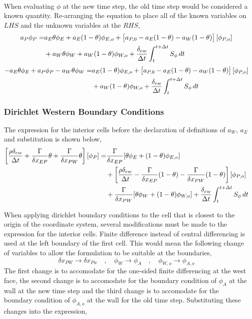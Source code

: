 \documentclass[a4paper, 12pt]{report}
\begin{document}
\begin{center}
\begin{equation*}
\begin{split}
\end{split}
\end{equation*}
When evaluating $\phi$ at the new time step, the old time step would be considered a known quantity. Re-arranging the equation to place all of the known variables on $LHS$ and the unknown variables at the $RHS$,
\begin{equation*}
\begin{split}
a_P\phi_{P} = & a_E\theta\phi_{E} + a_E(1-\theta)\phi_{E,o} + \left[a_{P,0} - a_E(1-\theta) - a_W(1-\theta)\right][\phi_{P,o}] \\ & + a_W\theta\phi_{W} + a_W(1-\theta)\phi_{W,o} + \frac{\delta_{ew}}{\Delta t}\int^{t+\Delta t}_{t} S_\phi\,dt 
\end{split}
\end{equation*}
\begin{equation*}
\begin{split}
 - a_E\theta\phi_{E} + a_P\phi_{P}  - a_W\theta\phi_{W} = & a_E(1-\theta)\phi_{E,o} + \left[a_{P,0} - a_E(1-\theta) - a_W(1-\theta)\right][\phi_{P,o}] \\ & + a_W(1-\theta)\phi_{W,o} + \frac{\delta_{ew}}{\Delta t}\int^{t+\Delta t}_{t} S_\phi\,dt 
\end{split}
\end{equation*}

\subsubsection{Dirichlet Western Boundary Conditions}
The expression for the interior cells before the declaration of definitions of $a_W$, $a_E$ and substitution is shown below,
\begin{equation*}
\begin{split}
\left[\frac{\rho\delta_{ew}}{\Delta t} + \frac{\Gamma}{\delta x_{EP}}\theta + \frac{\Gamma}{\delta x_{PW}}\theta\right][\phi_{P}] = & \frac{\Gamma }{\delta x_{EP}}[\theta\phi_{E} + (1-\theta)\phi_{E,o}]\\ & +\left[\frac{\rho\delta_{ew}}{\Delta t} - \frac{\Gamma }{\delta x_{EP}}(1-\theta) - \frac{\Gamma }{\delta x_{PW}}(1-\theta)\right][\phi_{P,o}] \\ &  + \frac{\Gamma }{\delta x_{PW}}[\theta\phi_{W} + (1-\theta)\phi_{W,o}] + \frac{\delta_{ew}}{\Delta t}\int^{t+\Delta t}_{t} S_\phi\,dt 
\end{split}
\end{equation*}

When applying dirichlet boundary conditions to the cell that is closest to the origin of the coordinate system, several modifications must be made to the expression for the interior cells. Finite difference instead of central differencing is used at the left boundary of the first cell. This would mean the following change of variables to allow the formulation to be suitable at the boundaries,
$$\delta x_{PW}\to \delta x_{Pw} \quad,\quad \phi_{W} \to \phi_{A} \quad,\quad \phi_{W,o} \to \phi_{A,o}$$
The first change is to accomodate for the one-sided finite differencing at the west face, the second change is to accomodate for the boundary condition of $\phi_{A}$ at the wall at the new time step and the third change is to accomodate for the boundary condition of $\phi_{A,o}$ at the wall for the old time step. Substituting these changes into the expression,


\end{center}
\end{document}

